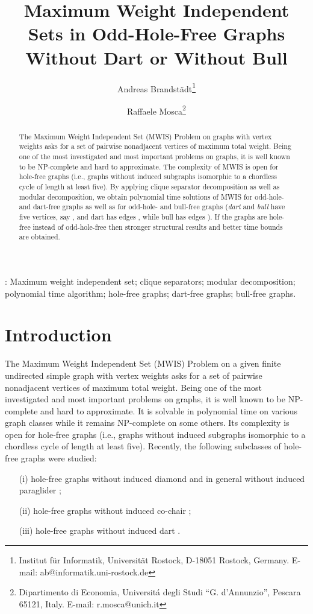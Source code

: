 \documentclass[11pt]{article}
\title{Maximum Weight Independent Sets in Odd-Hole-Free Graphs Without Dart or Without Bull}
\author{
Andreas Brandst\"adt\thanks{Institut f\"ur Informatik, Universit\"at Rostock, 
D-18051 Rostock, Germany. E-mail: ab@informatik.uni-rostock.de} 
\and
Raffaele Mosca\thanks{Dipartimento di Economia, Universit\'a degli Studi ``G. d'Annunzio'', Pescara 65121, Italy. 
E-mail: r.mosca@unich.it}}
\date{}
\newcommand{\0}{\text{ has a co-join to }}
\newcommand{\1}{\text{ has a join to }}
\begin{document}
\maketitle

\begin{abstract} 
The Maximum Weight Independent Set (MWIS) Problem on graphs with vertex weights asks for a set of pairwise nonadjacent vertices of maximum total weight. Being one of the most investigated and most important problems on graphs, it is well known to be NP-complete and hard to approximate. 
The complexity of MWIS is open for hole-free graphs (i.e., graphs without induced subgraphs isomorphic to a chordless cycle of length at least five). By applying clique separator decomposition as well as modular decomposition, we obtain polynomial time solutions of MWIS for odd-hole- and dart-free graphs as well as for odd-hole- and bull-free graphs ({\em dart} and {\em bull} have five vertices, say , and dart has edges , while bull has edges 
). If the graphs are hole-free instead of odd-hole-free then stronger structural results and better time bounds are obtained.
\end{abstract}

: Maximum weight independent set; clique separators; modular decomposition; polynomial time algorithm; 
hole-free graphs; dart-free graphs; bull-free graphs.

\section{Introduction}

The Maximum Weight Independent Set (MWIS) Problem on a given finite undirected simple graph with vertex weights asks for a set of pairwise nonadjacent vertices of maximum total weight. Being one of the most investigated and most important problems on graphs, it is well known to be NP-complete and hard to approximate. It is solvable in polynomial time on various graph classes while it remains NP-complete on some others. Its complexity is open for hole-free graphs (i.e., graphs without induced subgraphs isomorphic to a chordless cycle of length at least five). Recently, the following subclasses of hole-free graphs were studied: 
\begin{itemize} 
\item[(i)] hole-free graphs without induced diamond and in general without induced paraglider \cite{BraGiaMaf2012}; 
\item[(ii)] hole-free graphs without induced co-chair \cite{BraGia2012};
\item[(iii)] hole-free graphs without induced dart \cite{BasChaKar2012}.  
\end{itemize} 
\end{document}
